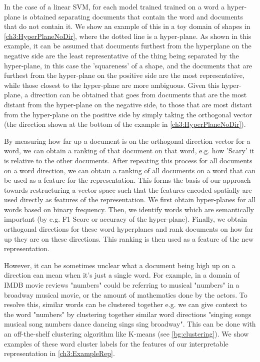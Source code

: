  In the case of a linear SVM, for each model trained trained on a word a hyper-plane is obtained separating documents that contain the word and documents that do not contain it. We show an example of this in a toy domain of shapes in \ref{ch3:HyperPlaneNoDir}, where the dotted line is a hyper-plane. As shown in this example, it can be assumed that documents furthest from the hyperplane on the negative side are the least representative of the thing being separated by the hyper-plane, in this case the 'squareness' of a shape, and the documents that are furthest from the hyper-plane on the positive side are the most representative, while those closest to the hyper-plane are more ambiguous. Given this hyper-plane, a direction can be obtained  that goes from documents that are the most distant from the hyper-plane on the negative side, to those that are most distant from the hyper-plane on the positive side by simply taking the orthogonal vector (the direction shown at the bottom of the example in \ref{ch3:HyperPlaneNoDir}).

By measuring how far up a document is on the orthogonal direction vector for a word, we can obtain a ranking of that document on that word, e.g. how 'Scary' it is relative to the other documents. After repeating this process for all documents on a word direction, we can obtain a ranking of all documents on a word that can be used as a feature for the representation. This forms the basis of our approach towards restructuring a vector space such that the features encoded spatially are used directly as features of the representation. We first obtain hyper-planes for all words based on binary frequency. Then, we identify words which are semantically important (by e.g. F1 Score or accuracy of the hyper-plane). Finally, we obtain orthogonal directions for these word hyperplanes and rank documents on how far up they are on these directions. This ranking is then used as a feature of the new representation.

 However, it can be sometimes unclear what a document being high up on a direction can mean when it's just a single word. For example, in a domain of IMDB movie reviews "numbers" could be referring to musical "numbers" in a broadway musical movie, or the amount of mathematics done by the actors. To resolve this, similar words can be clustered together e.g.  we can give context to the word "numbers" by clustering together similar word directions  "singing songs musical song numbers dance dancing sings sing broadway". This can be done with an off-the-shelf clustering algorithm like K-means (see \ref{bg:clustering}). We show examples of these word cluster labels for the features of our interpretable representation in \ref{ch3:ExampleRep}.
 
